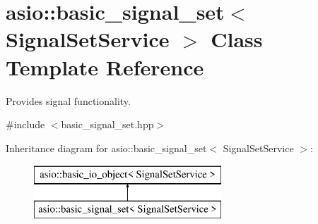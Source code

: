 \hypertarget{classasio_1_1basic__signal__set}{}\section{asio\+:\+:basic\+\_\+signal\+\_\+set$<$ Signal\+Set\+Service $>$ Class Template Reference}
\label{classasio_1_1basic__signal__set}


Provides signal functionality.  




{\ttfamily \#include $<$basic\+\_\+signal\+\_\+set.\+hpp$>$}

Inheritance diagram for asio\+:\+:basic\+\_\+signal\+\_\+set$<$ Signal\+Set\+Service $>$\+:\begin{figure}[H]
\begin{center}
\leavevmode
\includegraphics[height=2.000000cm]{classasio_1_1basic__signal__set}
\end{center}
\end{figure}
